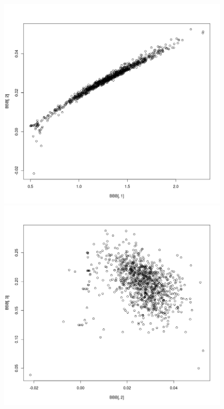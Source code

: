 \documentclass[]{article}
\begin{document}
\begin{figure}[h]
\includegraphics[width=.5\textwidth]{bolh.png}
\includegraphics[width=.5\textwidth]{b0mh.png}

\end{figure}
\end{document}
